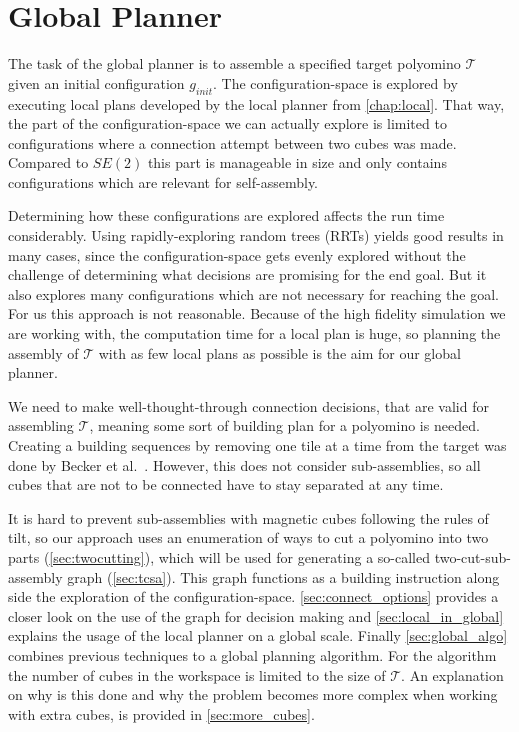 \chapter{Global Planner}
\label{chap:global}

The task of the global planner is to assemble a specified target polyomino $\mathcal{T}$ given an initial configuration $g_\textit{init}$.
The configuration-space is explored by executing local plans developed by the local planner from \autoref{chap:local}.
That way, the part of the configuration-space we can actually explore is limited to configurations where a connection attempt between two cubes was made.
Compared to $SE(2)$ this part is manageable in size and only contains configurations which are relevant for self-assembly.

Determining how these configurations are explored affects the run time considerably.
Using rapidly-exploring random trees (RRTs) \cite{lavalle1998} yields good results in many cases, since the configuration-space gets evenly explored without the challenge of determining what decisions are promising for the end goal.
But it also explores many configurations which are not necessary for reaching the goal.
For us this approach is not reasonable. 
Because of the high fidelity simulation we are working with, the computation time for a local plan is huge, so planning the assembly of $\mathcal{T}$ with as few local plans as possible is the aim for our global planner.

We need to make well-thought-through connection decisions, that are valid for assembling $\mathcal{T}$, meaning some sort of building plan for a polyomino is needed.
Creating a building sequences by removing one tile at a time from the target was done by Becker et al.\ \cite{Becker2020}.
However, this does not consider sub-assemblies, so all cubes that are not to be connected have to stay separated at any time.

It is hard to prevent sub-assemblies with magnetic cubes following the rules of tilt, so our approach uses an enumeration of ways to cut a polyomino into two parts (\autoref{sec:twocutting}), which will be used for generating a so-called two-cut-sub-assembly graph (\autoref{sec:tcsa}).
This graph functions as a building instruction along side the exploration of the configuration-space.
\autoref{sec:connect_options} provides a closer look on the use of the graph for decision making and \autoref{sec:local_in_global} explains the usage of the local planner on a global scale. 
Finally \autoref{sec:global_algo} combines previous techniques to a global planning algorithm.
For the algorithm the number of cubes in the workspace is limited to the size of $\mathcal{T}$.
An explanation on why is this done and why the problem becomes more complex when working with extra cubes, is provided in \autoref{sec:more_cubes}.


